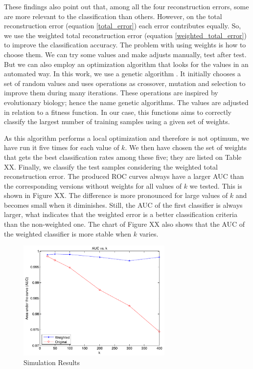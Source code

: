 \documentclass[10pt, conference, compsocconf]{IEEEtran}
\begin{document}
These findings also point out that, among all the four reconstruction errors, some are more relevant to the classification than others. However, on the total reconstruction error (equation \ref{total_error}) each error contributes equally. So, we use the weighted total reconstruction error (equation \ref{weighted_total_error}) to improve the classification accuracy. The problem with using weights is how to choose them. We can try some values and make adjusts manually, test after test. But we can also employ an optimization algorithm that looks for the values in an automated way. In this work, we use a genetic algorithm \cite{ga}. It initially chooses a set of random values and uses operations as crossover, mutation and selection to improve them during many iterations. These operations are inspired by evolutionary biology; hence the name genetic algorithms. The values are adjusted in relation to a fitness function. In our case, this functions aims to correctly classify the largest number of training samples using a given set of weights.

As this algorithm performs a local optimization and therefore is not optimum, we have run it five times for each value of $k$. We then have chosen the set of weights that gets the best classification rates among these five; they are listed on Table XX. Finally, we classify the test samples considering the weighted total reconstruction error. The produced ROC curves always have a larger AUC than the corresponding versions without weights for all values of $k$ we tested. This is shown in Figure XX. The difference is more pronounced for large values of $k$ and becomes small when it diminishes. Still, the AUC of the first classifier is always larger, what indicates that the weighted error is a better classification criteria than the non-weighted one. The chart of Figure XX also shows that the AUC of the weighted classifier is more stable when $k$ varies.

\begin{figure}[t]
\centering
\includegraphics[width=3in]{chart_auc_vs_k}
\caption{Simulation Results}
\label{auc_vs_k}
\end{figure}
\end{document}
